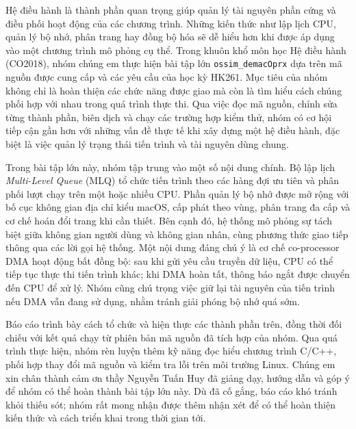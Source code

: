 \documentclass[12pt,a4paper]{article}
\begin{document}
	Hệ điều hành là thành phần quan trọng giúp quản lý tài nguyên phần cứng và điều phối hoạt động của các chương trình. Những kiến thức như lập lịch CPU, quản lý bộ nhớ, phân trang hay đồng bộ hóa sẽ dễ hiểu hơn khi được áp dụng vào một chương trình mô phỏng cụ thể. Trong khuôn khổ môn học Hệ điều hành (CO2018), nhóm chúng em thực hiện bài tập lớn \texttt{ossim\_demacOprx} dựa trên mã nguồn được cung cấp và các yêu cầu của học kỳ HK261. Mục tiêu của nhóm không chỉ là hoàn thiện các chức năng được giao mà còn là tìm hiểu cách chúng phối hợp với nhau trong quá trình thực thi. Qua việc đọc mã nguồn, chỉnh sửa từng thành phần, biên dịch và chạy các trường hợp kiểm thử, nhóm có cơ hội tiếp cận gần hơn với những vấn đề thực tế khi xây dựng một hệ điều hành, đặc biệt là việc quản lý trạng thái tiến trình và tài nguyên dùng chung.

	Trong bài tập lớn này, nhóm tập trung vào một số nội dung chính. Bộ lập lịch \textit{Multi-Level Queue} (MLQ) tổ chức tiến trình theo các hàng đợi ưu tiên và phân phối lượt chạy trên một hoặc nhiều CPU. Phần quản lý bộ nhớ được mở rộng với bố cục không gian địa chỉ kiểu macOS, cấp phát theo vùng, phân trang đa cấp và cơ chế hoán đổi trang khi cần thiết. Bên cạnh đó, hệ thống mô phỏng sự tách biệt giữa không gian người dùng và không gian nhân, cùng phương thức giao tiếp thông qua các lời gọi hệ thống. Một nội dung
	đáng chú ý là cơ chế co-processor DMA hoạt động bất đồng bộ: sau khi gửi yêu cầu truyền dữ liệu, CPU có thể tiếp tục thực thi tiến trình khác; khi DMA hoàn tất, thông báo ngắt được chuyển đến CPU để xử lý. Nhóm cũng chú trọng việc giữ lại tài nguyên của tiến trình nếu DMA vẫn đang sử dụng, nhằm tránh giải phóng bộ nhớ quá sớm.

	Báo cáo trình bày cách tổ chức và hiện thực các thành phần trên, đồng thời đối chiếu với kết quả chạy từ phiên bản mã nguồn đã tích hợp của nhóm. Qua quá trình thực hiện, nhóm rèn luyện thêm kỹ năng đọc hiểu chương trình C/C++, phối hợp thay đổi mã nguồn và kiểm tra lỗi trên môi trường Linux. Chúng em xin chân thành cảm ơn thầy Nguyễn Tuấn Huy đã giảng dạy, hướng dẫn và góp ý để nhóm có thể hoàn thành bài tập lớn này. Dù đã cố gắng, báo cáo khó tránh khỏi thiếu sót; nhóm rất mong nhận được thêm nhận xét để có thể hoàn thiện kiến thức và cách triển khai trong thời gian tới.

	\clearpage

\end{document}
